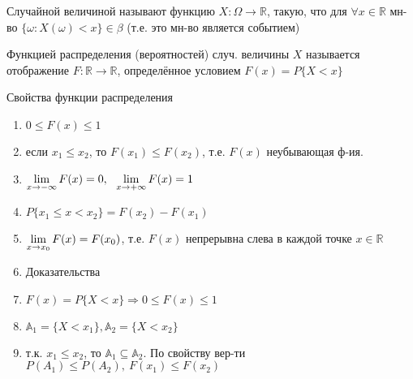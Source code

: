 
\OPR Случайной величиной называют функцию $X:\Omega\rightarrow\mathbb{R}$, такую, что для $\forall x\in\mathbb{R}$ мн-во $\{\omega : X(\omega)<x\}\in \beta$ (т.е. это мн-во является событием)

\OPR Функцией распределения (вероятностей) случ. величины $X$ называется отображение $F:\mathbb{R}\rightarrow\mathbb{R}$, определённое условием $F(x) = P\{X<x\}$

Свойства функции распределения
\begin{enumerate}[topsep=0pt, leftmargin=20pt, noitemsep, label=\arabic*\degree]
	\item $0\leq F(x) \leq 1$
	
	\item если $x_1\leq x_2$, то $F(x_1)\leq F(x_2)$, т.е. $F(x)$ неубывающая ф-ия.
	
	\item $\liml_{\toinf[-]{x}}F(x) = 0,~~\liml_{\toinf[+]{x}}F(x) = 1$
	
	\item $P\{x_1\leq x<x_2\}=F(x_2)-F(x_1)$
	
	\item $\liml_{x\rightarrow x_0}F(x)=F(x_0)$, т.е. $F(x)$ непрерывна слева в каждой точке $x\in\mathbb{R}$
	
	\item [] Доказательства
	
	\setcounter{enumi}{0}
	
	\item $F(x)=P\{X<x\}\Rightarrow0\leq F(x)\leq 1$
	
	\item $\mathbb{A}_1=\{X<x_1\}, \mathbb{A}_2=\{X<x_2\}$
	\item [] т.к. $x_1\leq x_2$, то $\mathbb{A}_1\subseteq \mathbb{A}_2$. По свойству вер-ти $P(A_1)\leq P(A_2),~F(x_1)\leq F(x_2)$
	

\end{enumerate}
